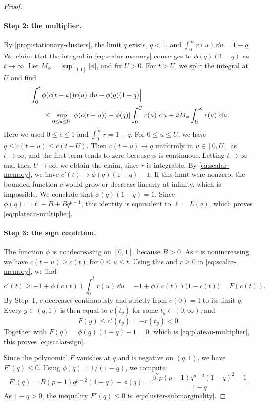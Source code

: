 \begin{proof}
\paragraph{Step 2: the multiplier.}
By \cref{prop:stationary-clusters}, the limit $q$ exists, $q<1$, and $\int_0^\infty r(u)\,\dd u=1-q$. We claim that the integral in \eqref{eq:scalar-memory} converges to $\phi(q)(1-q)$ as $t\to\infty$. Let $M_\phi=\sup_{[0,1]}|\phi|$, and fix $U>0$. For $t>U$, we split the integral at $U$ and find
\[
\begin{aligned}
 &\Bigl|\int_0^t\phi(c(t-u))r(u)\,\mathop{}\!\mathrm d u-\phi(q)(1-q)\Bigr|\\
 &\qquad\le\sup_{0\le u\le U}|\phi(c(t-u))-\phi(q)|\int_0^Ur(u)\,\mathop{}\!\mathrm d u
 +2M_\phi\int_U^\infty r(u)\,\mathop{}\!\mathrm d u.
\end{aligned}
\]
Here we used $0\le c\le1$ and $\int_0^\infty r=1-q$. For $0\le u\le U$, we have $q\le c(t-u)\le c(t-U)$. Then $c(t-u)\to q$ uniformly in $u\in[0,U]$ as $t\to\infty$, and the first term tends to zero because $\phi$ is continuous. Letting $t\to\infty$ and then $U\to\infty$, we obtain the claim, since $r$ is integrable. By \eqref{eq:scalar-memory}, we have $c'(t)\to\phi(q)(1-q)-1$. If this limit were nonzero, the bounded function $c$ would grow or decrease linearly at infinity, which is impossible. We conclude that $\phi(q)(1-q)=1$. Since $\phi(q)=\ell-B+Bq^{p-1}$, this identity is equivalent to $\ell=L(q)$, which proves \eqref{eq:plateau-multiplier}.

\paragraph{Step 3: the sign condition.}
The function $\phi$ is nondecreasing on $[0,1]$, because $B>0$. As $c$ is nonincreasing, we have $c(t-u)\ge c(t)$ for $0\le u\le t$. Using this and $r\ge0$ in \eqref{eq:scalar-memory}, we find
\[
 c'(t)\ge-1+\phi(c(t))\int_0^tr(u)\,\dd u=-1+\phi(c(t))\bigl(1-c(t)\bigr)=F(c(t)).
\]
By Step~1, $c$ decreases continuously and strictly from $c(0)=1$ to its limit $q$. Every $y\in(q,1)$ is then equal to $c(t_y)$ for some $t_y\in(0,\infty)$, and
\[
 F(y)\le c'(t_y)=-r(t_y)<0.
\]
Together with $F(q)=\phi(q)(1-q)-1=0$, which is \eqref{eq:plateau-multiplier}, this proves \eqref{eq:scalar-sign}.

Since the polynomial $F$ vanishes at $q$ and is negative on $(q,1)$, we have $F'(q)\le0$. Using $\phi(q)=1/(1-q)$, we compute
\[
 F'(q)=B(p-1)q^{p-2}(1-q)-\phi(q)=\frac{\beta^2p(p-1)q^{p-2}(1-q)^2-1}{1-q}.
\]
As $1-q>0$, the inequality $F'(q)\le0$ is \eqref{eq:cluster-submarginality}.
\end{proof}

